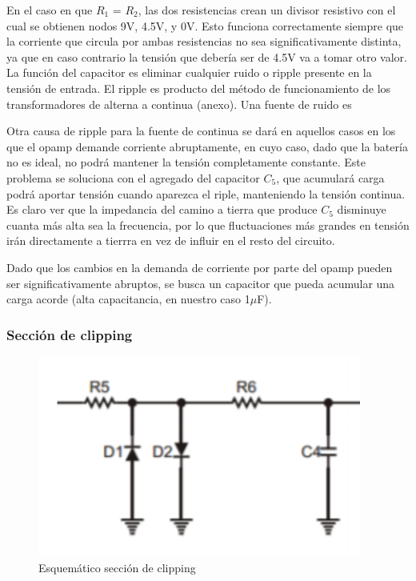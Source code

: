 \documentclass[../../main.tex]{subfiles}
\begin{document}
En el caso en que $R_1$ = $R_2$, las dos resistencias crean un divisor resistivo con el cual se obtienen nodos 9V, 4.5V, y 0V. Esto funciona correctamente siempre que la corriente que circula por ambas resistencias no sea significativamente distinta, ya que en caso contrario la tensión que debería ser de 4.5V va a tomar otro valor. 
La función del capacitor es eliminar cualquier ruido o ripple presente en la tensi\'on de entrada. El ripple es producto del m\'etodo de funcionamiento de los transformadores de alterna a continua (anexo). Una fuente de ruido es ~~~\par
Otra causa de ripple para la fuente de continua se dará en aquellos casos en los que el opamp demande corriente abruptamente, en cuyo caso, dado que la batería no es ideal, no podrá mantener la tensión completamente constante. Este problema se soluciona con el agregado del capacitor $C_5$, que acumulará carga podrá aportar tensión cuando aparezca el riple, manteniendo la tensión continua. Es claro ver que la impedancia del camino a tierra que produce $C_5$ disminuye cuanta más alta sea la frecuencia, por lo que fluctuaciones más grandes en tensión irán directamente a tierrra en vez de influir en el resto del circuito.\par
Dado que los cambios en la demanda de corriente por parte del opamp pueden ser significativamente abruptos, se busca un capacitor que pueda acumular una carga acorde (alta capacitancia, en nuestro caso 1$\mu$F). 

\subsubsection{Secci\'on de clipping}

\begin{figure}[H]	%
	\centering
	\includegraphics[scale=1]{imagenes/esquematico_clipping.png}
	\caption{Esquem\'atico secci\'on de clipping}
	\label{fig:ej5_esquematico_clipping}
\end{figure}
\end{document}
